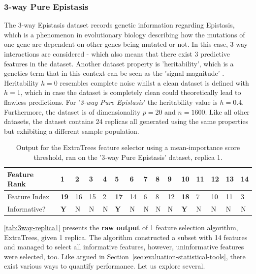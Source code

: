 \documentclass{article}
\begin{document}
\subsubsection{3-way Pure Epistasis}
The 3-way Epistasis dataset records genetic information regarding Epistasis, which is a phenomenon in evolutionary biology describing how the mutations of one gene are dependent on other genes being mutated or not. In this case, 3-way interactions are considered - which also means that there exist 3 predictive features in the dataset. Another dataset property is 'heritability', which is a genetics term that in this context can be seen as the 'signal magnitude' \citep{urbanowicz2018benchmarking}. Heritability $h = 0$ resembles complete noise whilst a clean dataset is defined with $h = 1$, which in case the dataset is completely clean could theoretically lead to flawless predictions. For '\textit{3-way Pure Epistasis}' the heritability value is $h = 0.4$. Furthermore, the dataset is of dimensionality $p = 20$ and $n = 1600$. Like all other datasets, the dataset contains 24 replicas all generated using the same properties but exhibiting a different sample population.

\begin{table}[ht]
\centering
\begin{tabular}{@{}lllllllllllllll@{}}
\toprule
Feature Rank  & 1  & 2  & 3  & 4 & 5  & 6  & 7 & 8 & 9  & 10 & 11 & 12 & 13 & 14 \\ \midrule
Feature Index & \textbf{19} & 16 & 15 & 2 & \textbf{17} & 14 & 6 & 8 & 12 & \textbf{18} & 7  & 10 & 11 & 3  \\
Informative?    & \textbf{Y}  & N  & N  & N & \textbf{Y}  & N  & N & N &  N & \textbf{Y}  & N & N & N  & N   \\ \bottomrule
\end{tabular}
\caption{Output for the ExtraTrees feature selector using a mean-importance score threshold, ran on the '3-way Pure Epistasis' dataset, replica 1. }
\label{tab:3way-replica1}
\end{table}

\autoref{tab:3way-replica1} presents the \textbf{raw output} of 1 feature selection algorithm, ExtraTrees, given 1 replica. The algorithm constructed a subset with 14 features and managed to select all informative features, however, uninformative features were selected, too. Like argued in Section~\ref{sec:evaluation-statistical-tools}, there exist various ways to quantify performance. Let us explore several.
\end{document}
